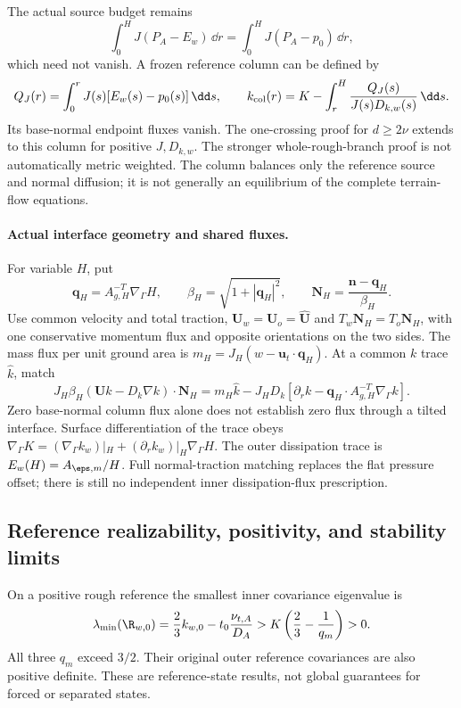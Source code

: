 The actual source budget remains
\[
 \int_0^HJ(P_A-E_w)\,\dd r
 =\int_0^HJ(P_A-p_0)\,\dd r,
\]
which need not vanish. A frozen reference column can be defined by
\begin{equation}
 Q_J(r)=\int_0^rJ(s)[E_w(s)-p_0(s)]\,\dd s,\qquad
 k_{\rm col}(r)=K-\int_r^H
        \frac{Q_J(s)}{J(s)D_{k,w}(s)}\,\dd s.
 \label{mawf:curved-column}
\end{equation}
Its base-normal endpoint fluxes vanish.
The one-crossing proof for \(d\ge2\nu\) extends to this column
for positive \(J,D_{k,w}\).
The stronger whole-rough-branch proof is not automatically
metric weighted. The column balances only the reference source
and normal diffusion; it is not generally an equilibrium of
the complete terrain-flow equations.

\paragraph{Actual interface geometry and shared fluxes.}
For variable \(H\), put
\begin{equation}
 \bm q_H=A_{g,H}^{-T}\nabla_\Gamma H,\qquad
 \beta_H=\sqrt{1+|\bm q_H|^2},\qquad
 \bm N_H=\frac{\bm n-\bm q_H}{\beta_H}.
 \label{mawf:interface-normal}
\end{equation}
Use common velocity and total traction,
\(\bm U_w=\bm U_o=\widehat{\bm U}\) and
\(T_w\bm N_H=T_o\bm N_H\), with one conservative momentum
flux and opposite orientations on the two sides.
The mass flux per unit ground area is
\(m_H=J_H(w-\bm u_t\cdot\bm q_H)\).
At a common \(k\) trace \(\widehat k\), match
\begin{equation}
 J_H\beta_H(\bm U k-D_k\nabla k)\cdot\bm N_H
 =m_H\widehat k-J_HD_k
 \left[\partial_rk-\bm q_H\cdot A_{g,H}^{-T}\nabla_\Gamma k\right].
 \label{mawf:curved-k-flux}
\end{equation}
Zero base-normal column flux alone does not establish zero flux
through a tilted interface. Surface differentiation of the trace
obeys
\(\nabla_\Gamma K=(\nabla_\Gamma k_w)|_H+
(\partial_rk_w)|_H\nabla_\Gamma H\).
The outer dissipation trace is \(E_w(H)=A_{\eps,m}/H\).
Full normal-traction matching replaces the flat pressure offset;
there is still no independent inner dissipation-flux prescription.

\subsection{Reference realizability, positivity, and stability limits}
\label{mawf:stability}
On a positive rough reference the smallest inner covariance
eigenvalue is
\begin{equation}
 \lambda_{\min}(\R_{w,0})
 =\frac23k_{w,0}-t_0\frac{\nu_{t,A}}{D_A}
 >K\left(\frac23-\frac1{q_m}\right)>0.
 \label{mawf:covariance}
\end{equation}
All three \(q_m\) exceed \(3/2\). Their original outer reference
covariances are also positive definite. These are reference-state
results, not global guarantees for forced or separated states.

